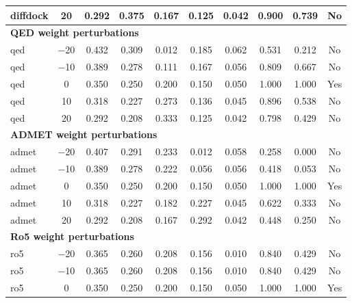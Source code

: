 \documentclass[journal=jcisd8,manuscript=suppinfo]{achemso}
\begin{document}
\begin{table}[!htbp]
\begin{tabular}{lccccccccc}
diffdock & \num{+20} & \num{0.292} & \num{0.375} & \num{0.167} & \num{0.125} & \num{0.042} & \num{0.900} & \num{0.739} & No \\
\midrule
\multicolumn{10}{l}{\textbf{QED weight perturbations}} \\
qed & \num{-20} & \num{0.432} & \num{0.309} & \num{0.012} & \num{0.185} & \num{0.062} & \num{0.531} & \num{0.212} & No \\
qed & \num{-10} & \num{0.389} & \num{0.278} & \num{0.111} & \num{0.167} & \num{0.056} & \num{0.809} & \num{0.667} & No \\
qed & \num{0} & \num{0.350} & \num{0.250} & \num{0.200} & \num{0.150} & \num{0.050} & \num{1.000} & \num{1.000} & Yes \\
qed & \num{+10} & \num{0.318} & \num{0.227} & \num{0.273} & \num{0.136} & \num{0.045} & \num{0.896} & \num{0.538} & No \\
qed & \num{+20} & \num{0.292} & \num{0.208} & \num{0.333} & \num{0.125} & \num{0.042} & \num{0.798} & \num{0.429} & No \\
\midrule
\multicolumn{10}{l}{\textbf{ADMET weight perturbations}} \\
admet & \num{-20} & \num{0.407} & \num{0.291} & \num{0.233} & \num{0.012} & \num{0.058} & \num{0.258} & \num{0.000} & No \\
admet & \num{-10} & \num{0.389} & \num{0.278} & \num{0.222} & \num{0.056} & \num{0.056} & \num{0.418} & \num{0.053} & No \\
admet & \num{0} & \num{0.350} & \num{0.250} & \num{0.200} & \num{0.150} & \num{0.050} & \num{1.000} & \num{1.000} & Yes \\
admet & \num{+10} & \num{0.318} & \num{0.227} & \num{0.182} & \num{0.227} & \num{0.045} & \num{0.622} & \num{0.333} & No \\
admet & \num{+20} & \num{0.292} & \num{0.208} & \num{0.167} & \num{0.292} & \num{0.042} & \num{0.448} & \num{0.250} & No \\
\midrule
\multicolumn{10}{l}{\textbf{Ro5 weight perturbations}} \\
ro5 & \num{-20} & \num{0.365} & \num{0.260} & \num{0.208} & \num{0.156} & \num{0.010} & \num{0.840} & \num{0.429} & No \\
ro5 & \num{-10} & \num{0.365} & \num{0.260} & \num{0.208} & \num{0.156} & \num{0.010} & \num{0.840} & \num{0.429} & No \\
ro5 & \num{0} & \num{0.350} & \num{0.250} & \num{0.200} & \num{0.150} & \num{0.050} & \num{1.000} & \num{1.000} & Yes \\

\end{tabular}
\end{table}
\end{document}
